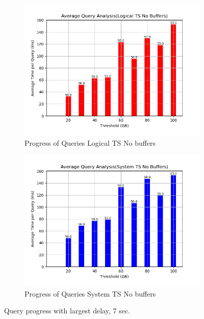 \begin{figure}
\begin{subfigure}[c]{0.4\textwidth}
		\label{fig:progress-queries-7-system}
	\end{subfigure}
	\begin{subfigure}[c]{0.4\textwidth}
		\includegraphics[width=1\textwidth]   {figures/Experiments/Dynamic/Progress/7/average_query_time_per_batch_version_999777016_10485760_10_delay[7].png}
		\caption{Progress of Queries Logical TS No buffers}
		\label{fig:progress-queries-7-logical-no-buffers}
	\end{subfigure}
	\begin{subfigure}[c]{0.4\textwidth}
		\includegraphics[width=1\textwidth]   {figures/Experiments/Dynamic/Progress/7/average_query_time_per_batch_version_999777017_10485760_10_delay[7].png}
		\caption{Progress of Queries System TS No buffers}
		\label{fig:progress-queries-7-system-no-buffers}
	\end{subfigure}
	\caption{Query progress with largest delay, 7 sec.}
	\label{fig:query-progress-delay-7}
\end{figure}




